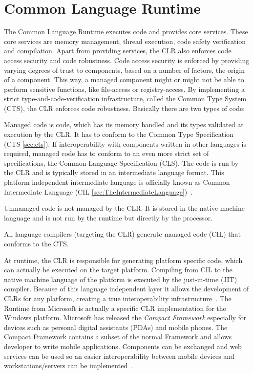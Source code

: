 \section{Common Language Runtime}
\label{sec:clr}
The Common Language Runtime executes code and provides core services. These core services are memory management, thread execution, code safety verification and compilation. Apart from providing services, the CLR also enforces code access security and code robustness. 
Code access security is enforced by providing varying degrees of trust to components, based on a number of factors, \eg the origin of a component. 
This way, a managed component might or might not be able to perform sensitive functions, like file-access or registry-access. 
By implementing a strict type-and-code-verification infrastructure, called the Common Type System (CTS), the CLR enforces code robustness. Basically there are two types of code; 

\begin{description}[noitemsep,style=nextline]
\item[Managed]
Managed code is code, which has its memory handled and its types validated at execution by the CLR.
It has to conform to the Common Type Specification (CTS \autoref{sec:cts}).
If interoperability with components written in other languages is required, managed code has to conform to an even more strict set of specifications, the Common Language Specification (CLS).
The code is run by the CLR and is typically stored in an intermediate language format. This platform independent intermediate language is officially known as Common Intermediate Language (CIL \autoref{sec:TheIntermediateLanguage})~\cite{Watkins00}.
\item[Unmanaged]
Unmanaged code is not managed by the CLR. It is stored in the native machine language and is not run by the runtime but directly by the processor.
\end{description}

All language compilers (targeting the CLR) generate managed code (CIL) that conforms to the CTS. 

At runtime, the CLR is responsible for generating platform specific code, which can actually be executed on the target platform.
Compiling from CIL to the native machine language of the platform is executed by the just-in-time (JIT) compiler. Because of this language independent layer it allows the development of CLRs for any platform, creating a true interoperability infrastructure~\cite{Watkins00}.
The \dotNET Runtime from Microsoft is actually a specific CLR implementation for the Windows platform.
Microsoft has released the \emph{\dotNET Compact Framework} especially for devices such as personal digital assistants (PDAs) and mobile phones.
The \dotNET Compact Framework contains a subset of the normal \dotNET Framework and allows \dotNET developer to write mobile applications. Components can be exchanged and web services can be used so an easier interoperability between mobile devices and workstations/servers can be implemented~\cite{Microsoft03-3}.

